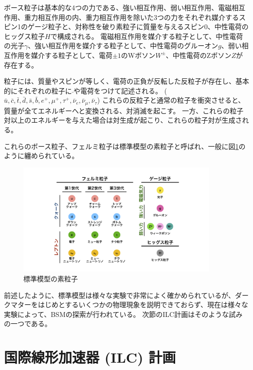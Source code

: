 ボース粒子は基本的な4つの力である、強い相互作用、弱い相互作用、電磁相互作用、重力相互作用の内、重力相互作用を除いた3つの力をそれぞれ媒介するスピン1のゲージ粒子と、対称性を破り素粒子に質量を与えるスピン0、中性電荷のヒッグス粒子$H$で構成される。
電磁相互作用を媒介する粒子として、中性電荷の光子$\gamma$、強い相互作用を媒介する粒子として、中性電荷のグルーオン$g$、弱い相互作用を媒介する粒子として、電荷$\pm 1$のWボソン$W^{\pm}$、中性電荷のZボソン$Z$が存在する。


粒子には、質量やスピンが等しく、電荷の正負が反転した反粒子が存在し、基本的にそれぞれの粒子に$\bar{}$や電荷をつけて記述される。 ($\bar{u}, \bar{c}, \bar{t}, \bar{d}, \bar{s}, \bar{b}, e^+, \mu^+, \tau^+, \bar{\nu}_{e}, \bar{\nu}_{\mu}, \bar{\nu}_{\tau}$)
これらの反粒子と通常の粒子を衝突させると、質量が全てエネルギーへと変換される、対消滅を起こす。
一方、これらの粒子対以上のエネルギーを与えた場合は対生成が起こり、これらの粒子対が生成される。

これらのボース粒子、フェルミ粒子は標準模型の素粒子と呼ばれ、一般に図\ref{1SMParticle}のように纏められている。

\begin{figure}[htbp]
 \centering
 \includegraphics[width=0.9\textwidth]{Figure/1Introduction/1SMParticle.png}
 \caption{標準模型の素粒子}
 \label{1SMParticle}
\end{figure}

前述したように、標準模型は様々な実験で非常によく確かめられているが、ダークマターをはじめとするいくつかの物理現象を説明できておらず、現在は様々な実験によって、BSMの探索が行われている。
次節のILC計画はそのような試みの一つである。

\section{国際線形加速器 (ILC) 計画} \label{Intro:InternationalLinearColliderProject}

